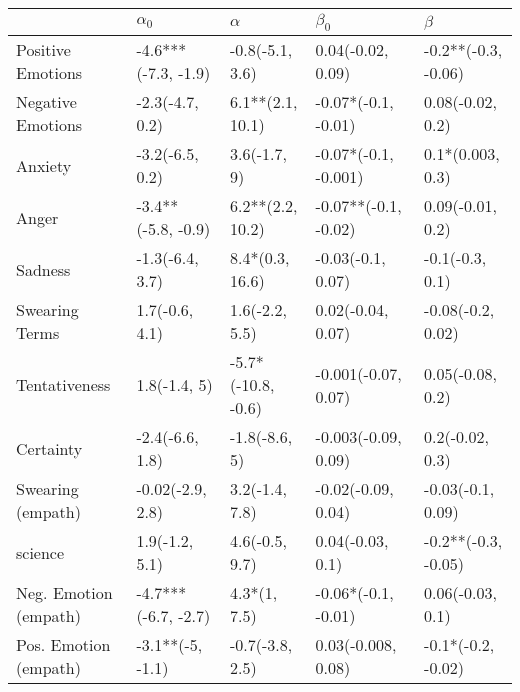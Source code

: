 \begin{tabular}{lllll}
\toprule
{} &           $\alpha_0$ &            $\alpha$ &             $\beta_0$ &              $\beta$ \\
\midrule
Positive Emotions     &  -4.6***(-7.3, -1.9) &     -0.8(-5.1, 3.6) &     0.04(-0.02, 0.09) &  -0.2**(-0.3, -0.06) \\
Negative Emotions     &      -2.3(-4.7, 0.2) &    6.1**(2.1, 10.1) &   -0.07*(-0.1, -0.01) &     0.08(-0.02, 0.2) \\
Anxiety               &      -3.2(-6.5, 0.2) &        3.6(-1.7, 9) &  -0.07*(-0.1, -0.001) &     0.1*(0.003, 0.3) \\
Anger                 &   -3.4**(-5.8, -0.9) &    6.2**(2.2, 10.2) &  -0.07**(-0.1, -0.02) &     0.09(-0.01, 0.2) \\
Sadness               &      -1.3(-6.4, 3.7) &     8.4*(0.3, 16.6) &     -0.03(-0.1, 0.07) &      -0.1(-0.3, 0.1) \\
Swearing Terms        &       1.7(-0.6, 4.1) &      1.6(-2.2, 5.5) &     0.02(-0.04, 0.07) &    -0.08(-0.2, 0.02) \\
Tentativeness         &         1.8(-1.4, 5) &  -5.7*(-10.8, -0.6) &   -0.001(-0.07, 0.07) &     0.05(-0.08, 0.2) \\
Certainty             &      -2.4(-6.6, 1.8) &       -1.8(-8.6, 5) &   -0.003(-0.09, 0.09) &      0.2(-0.02, 0.3) \\
Swearing (empath)     &     -0.02(-2.9, 2.8) &      3.2(-1.4, 7.8) &    -0.02(-0.09, 0.04) &    -0.03(-0.1, 0.09) \\
science               &       1.9(-1.2, 5.1) &      4.6(-0.5, 9.7) &      0.04(-0.03, 0.1) &  -0.2**(-0.3, -0.05) \\
Neg. Emotion (empath) &  -4.7***(-6.7, -2.7) &        4.3*(1, 7.5) &   -0.06*(-0.1, -0.01) &     0.06(-0.03, 0.1) \\
Pos. Emotion (empath) &     -3.1**(-5, -1.1) &     -0.7(-3.8, 2.5) &    0.03(-0.008, 0.08) &   -0.1*(-0.2, -0.02) \\
\bottomrule
\end{tabular}
